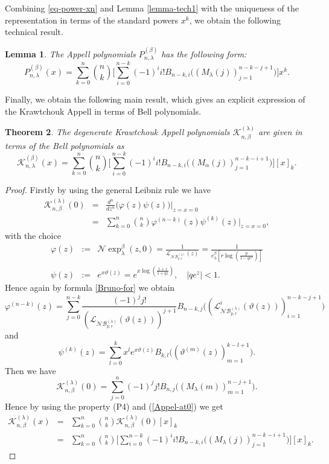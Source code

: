 \documentclass{birkjour}
\newtheorem{thm}{Theorem}[section]
\newtheorem{lem}[thm]{Lemma}
\theoremstyle{definition}
\theoremstyle{remark}
\numberwithin{equation}{section}
\begin{document}
Combining \eqref{eq-power-xn} and Lemma \ref{lemma-tech1} with the
uniqueness of the representation in terms of the standard powers
$x^{k}$, we obtain the following technical result.
\begin{lem}
The Appell polynomials $P^{(\beta)}_{n, \lambda}$ has the following
form:
$$
P^{(\beta)}_{n, \lambda}(x)=\displaystyle{
\sum^{n}_{k=0}\binom{n}{k}\Big[\sum^{n-k}_{i=0}(-1)^{i}i! B_{n-k,
i}\big((M_{\lambda}(j))^{n-k-j+1}_{j=1}\big)\Big]x^{k}}.
$$
\end{lem}
Finally, we obtain the following main result, which gives an
explicit expression of the Krawtchouk Appell in terms of Bell
polynomials.
\begin{thm}
The degenerate Krawtchouk Appell polynomials
$\mathcal{K}^{(\lambda)}_{n, \beta}$ are given in terms of the Bell
polynomials as
\begin{equation}\label{Generalized-Appel-FP}
\mathcal{K}^{(\beta)}_{n, \lambda}(x)=\displaystyle{\sum^{n}_{k=0}
\binom{n}{k}\Big[\sum^{n-k}_{i=0}(-1)^{i}i!B_{n-k,
i}\Big((M_{\alpha}(j))^{n-k-i+1}_{j=1}\Big)\Big][x]_{k}}.
\end{equation}
\end{thm}
\begin{proof}
Firstly by using the general Leibniz rule we have
$$\begin{array}{lll}
\mathcal{K}^{(\lambda)}_{n, \beta}(0)&=&\displaystyle{\frac{d^{n}}{dz^{n}}\big(\varphi(z)\psi(z)\big)|_{z=x=0}}\\
&=&\displaystyle{\sum^{n}_{k=0}\binom{n}{k}\varphi^{(n-k)}(z)\psi^{(k)}(z)|_{z=x=0}},
\end{array}$$
with the choice
$$\begin{array}{lll}
\varphi(z)&:=&\mathcal{N}\!\exp^{\beta}_{\lambda}(z,
0)=\displaystyle{\frac{1}{\mathcal{L}_{\mathcal{NB}^{(\lambda)}_{p,
r}}(z)}=
\frac{1}{e^{\beta}_{\lambda}[r\log(\frac{p}{1-qe^{z}})]}}\\
\psi(z)&:=&\displaystyle{e^{x\vartheta(z)}=e^{x\log(\frac{1+z}{1+qz})}},
\quad |qe^{z}|<1.
\end{array}$$
Hence again by formula \eqref{Bruno-for} we obtain
$$
\varphi^{(n-k)}(z)=\displaystyle{\sum^{n-k}_{j=0}\frac{(-1)^{j}j!}{(\mathcal{L}_{\mathcal{NB}^{(\lambda)}_{p,
r}}(\vartheta(z)))^{j+1}} B_{n-k,
j}\big((\mathcal{L}^{i}_{\mathcal{NB}^{(\lambda)}_{p,
r}}(\vartheta(z)))^{n-k-j+1}_{i=1}\big)}
$$
and
$$
\psi^{(k)}(z)=\displaystyle{\sum^{k}_{l=0}x^{l}e^{x\vartheta(z)}
B_{k, l}\big((\vartheta^{(m)}(z))^{k-l+1}_{m=1}\big)}.
$$
Then we have
\begin{equation}\label{Appel-at0}
\mathcal{K}^{(\lambda)}_{n,
\beta}(0)=\displaystyle{\sum^{n}_{j=0}(-1)^{j}j!B_{n,
j}\Big((M_{\lambda}(m))^{n-j+1}_{m=1}\Big)}.
\end{equation}
Hence by using the property (P4) and (\ref{Appel-at0}) we get
$$\begin{array}{lll}
\mathcal{K}^{(\lambda)}_{n,
\beta}(x)&=&\displaystyle{\sum^{n}_{k=0}\binom{n}{k}
\mathcal{K}^{(\lambda)}_{n, \beta}(0)[x]_{k}}\\
&=&\displaystyle{\sum^{n}_{k=0}\binom{n}{k}
\Big[\sum^{n-k}_{i=0}(-1)^{i}i!B_{n-k,
i}\Big((M_{\lambda}(j))^{n-k-i+1}_{j=1}\Big)\Big][x]_{k}}.
\end{array}$$
\end{proof}
\end{document}
